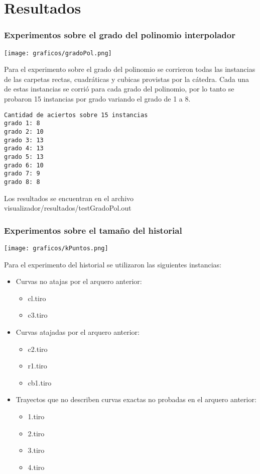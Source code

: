 \section{Resultados}

\subsubsection*{Experimentos sobre el grado del polinomio interpolador}

\texttt{[image: graficos/gradoPol.png]}

Para el experimento sobre el grado del polinomio se corrieron todas las
instancias de las carpetas rectas, cuadráticas y cubicas provistas por la
cátedra.  Cada una de estas instancias se corrió para cada grado del polinomio,
por lo tanto se probaron 15 instancias por grado variando el grado de 1 a 8.

\begin{verbatim}
Cantidad de aciertos sobre 15 instancias
grado 1: 8 
grado 2: 10
grado 3: 13
grado 4: 13
grado 5: 13
grado 6: 10
grado 7: 9
grado 8: 8
\end{verbatim}


Los resultados se encuentran en el archivo visualizador/resultados/testGradoPol.out

\subsubsection*{Experimentos sobre el tamaño del historial}

\texttt{[image: graficos/kPuntos.png]}

Para el experimento del historial se utilizaron las siguientes instancias:

\begin{itemize}
  \item Curvas no atajas por el arquero anterior:
  \begin{itemize}
    \item cl.tiro
    \item c3.tiro
  \end{itemize}
 \item Curvas atajadas por el arquero anterior:
  \begin{itemize}
    \item c2.tiro
    \item r1.tiro
    \item cb1.tiro
  \end{itemize}
  \item Trayectos que no describen curvas exactas no probadas en el arquero anterior: 
  \begin{itemize}
   \item 1.tiro
   \item 2.tiro
   \item 3.tiro
   \item 4.tiro
   \end{itemize}
\end{itemize}

